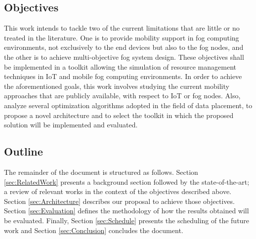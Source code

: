 
\subsection{Objectives}\label{subsec:Objectives}
This work intends to tackle two of the current limitations that are little or no treated in the literature. One is to provide mobility support in fog computing environments, not exclusively to the end devices but also to the fog nodes, and the other is to achieve multi-objective fog system design. These objectives shall be implemented in a toolkit allowing the simulation of resource management techniques in IoT and mobile fog computing environments. In order to achieve the aforementioned goals, this work involves studying the current mobility approaches that are publicly available, with respect to IoT or fog nodes. Also, analyze several optimization algorithms adopted in the field of data placement, to propose a novel architecture and to select the toolkit in which the proposed solution will be implemented and evaluated.

\subsection{Outline}\label{subsec:Outline}
The remainder of the document is structured as follows. Section \ref{sec:RelatedWork} presents a background section followed by the state-of-the-art; a review of relevant works in the context of the objectives described above. Section \ref{sec:Architecture} describes our proposal to achieve those objectives. Section \ref{sec:Evaluation} defines the methodology of how the results obtained will be evaluated. Finally, Section \ref{sec:Schedule} presents the scheduling of the future work and Section \ref{sec:Conclusion} concludes the document.